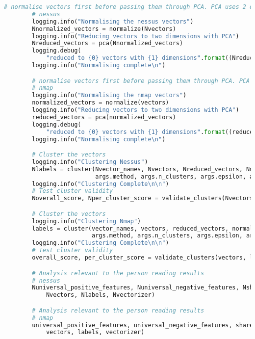 \begin{lstlisting}[language=python]
        # normalise vectors first before passing them through PCA. PCA uses 2 dimensions
        # nessus
        logging.info("Normalising the nessus vectors")
        Nnormalized_vectors = normalize(Nvectors)
        logging.info("Reducing vectors to two dimensions with PCA")
        Nreduced_vectors = pca(Nnormalized_vectors)
        logging.debug(
            "reduced to {0} vectors with {1} dimensions".format((Nreduced_vectors.shape[0]), Nreduced_vectors.shape[1]))
        logging.info("Normalising complete\n")

        # normalise vectors first before passing them through PCA. PCA uses 2 dimensions
        # nmap
        logging.info("Normalising the nmap vectors")
        normalized_vectors = normalize(vectors)
        logging.info("Reducing vectors to two dimensions with PCA")
        reduced_vectors = pca(normalized_vectors)
        logging.debug(
            "reduced to {0} vectors with {1} dimensions".format((reduced_vectors.shape[0]), reduced_vectors.shape[1]))
        logging.info("Normalising complete\n")

        # Cluster the vectors
        logging.info("Clustering Nessus")
        Nlabels = cluster(Nvector_names, Nvectors, Nreduced_vectors, Nnormalized_vectors, Nvectorizer, args.strategy,
                          args.method, args.n_clusters, args.epsilon, args.min_samples, args.metric)
        logging.info("Clustering Complete\n\n")
        # Test cluster validity
        Noverall_score, Nper_cluster_score = validate_clusters(Nvectors, Nlabels)

        # Cluster the vectors
        logging.info("Clustering Nmap")
        labels = cluster(vector_names, vectors, reduced_vectors, normalized_vectors, vectorizer, args.strategy,
                         args.method, args.n_clusters, args.epsilon, args.min_samples, args.metric)
        logging.info("Clustering Complete\n\n")
        # Test cluster validity
        overall_score, per_cluster_score = validate_clusters(vectors, labels)

        # Analysis relevant to the person reading results
        # nessus
        Nuniversal_positive_features, Nuniversal_negative_features, Nshared_features = get_common_features_from_cluster(
            Nvectors, Nlabels, Nvectorizer)

        # Analysis relevant to the person reading results
        # nmap
        universal_positive_features, universal_negative_features, shared_features = get_common_features_from_cluster(
            vectors, labels, vectorizer)


\end{lstlisting}
